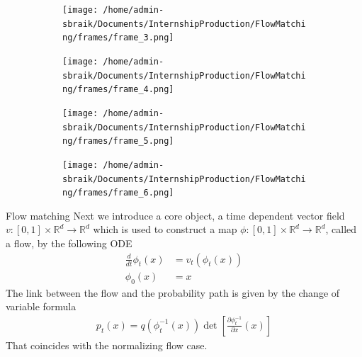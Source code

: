 \documentclass{beamer}
\begin{document}
\begin{frame}
    \begin{figure}[htbp]
        \centering
        \begin{subfigure}[b]{0.8\textwidth}
          \texttt{[image: /home/admin-sbraik/Documents/InternshipProduction/FlowMatching/frames/frame\_3.png]}
        \end{subfigure}
        \par\medskip
        \begin{subfigure}[b]{0.8\textwidth}
          \texttt{[image: /home/admin-sbraik/Documents/InternshipProduction/FlowMatching/frames/frame\_4.png]}
        \end{subfigure}
    \end{figure}
\end{frame}
\begin{frame}
    \begin{figure}[htbp]
        \centering
        \begin{subfigure}[b]{0.8\textwidth}
          \texttt{[image: /home/admin-sbraik/Documents/InternshipProduction/FlowMatching/frames/frame\_5.png]}
        \end{subfigure}
        \par\medskip
        \begin{subfigure}[b]{0.8\textwidth}
          \texttt{[image: /home/admin-sbraik/Documents/InternshipProduction/FlowMatching/frames/frame\_6.png]}
        \end{subfigure}
        
        \label{fig:interpolated_density}
    \end{figure}
\end{frame}


\begin{frame}{Flow matching}
    Next we introduce a core object, a time dependent vector field \(v:[0,1]\times\mathbb{R}^d\rightarrow \mathbb{R}^d\) which is used to construct a map \(\phi:[0,1]\times\mathbb{R}^d\rightarrow\mathbb{R}^d\), called a flow, by the following ODE
    \begin{align}
        \frac{d}{dt}\phi_t(x)&=v_t(\phi_t(x)) \\
        \phi_0(x)&=x \nonumber
    \end{align}
    The link between the flow and the probability path is given by the change of variable formula
    \begin{align}
        p_t(x)=q(\phi_t^{-1}(x))\det \left[\frac{\partial\phi_t^{-1}}{\partial x}(x)\right]
    \end{align}
    That coincides with the normalizing flow case.
\end{frame}
\end{document}
